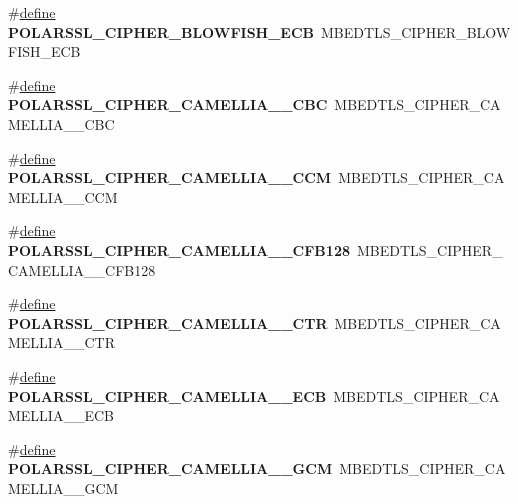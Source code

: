 \begin{DoxyCompactItemize}
\#\hyperlink{structdefine}{define} {\bfseries P\+O\+L\+A\+R\+S\+S\+L\+\_\+\+C\+I\+P\+H\+E\+R\+\_\+\+B\+L\+O\+W\+F\+I\+S\+H\+\_\+\+E\+CB}~M\+B\+E\+D\+T\+L\+S\+\_\+\+C\+I\+P\+H\+E\+R\+\_\+\+B\+L\+O\+W\+F\+I\+S\+H\+\_\+\+E\+CB
\item 
\mbox{\label{compat-1_83_8h_a45e63fa5969c68cc71e679618794284f}} 
\#\hyperlink{structdefine}{define} {\bfseries P\+O\+L\+A\+R\+S\+S\+L\+\_\+\+C\+I\+P\+H\+E\+R\+\_\+\+C\+A\+M\+E\+L\+L\+I\+A\+\_\+\_\+\+C\+BC}~M\+B\+E\+D\+T\+L\+S\+\_\+\+C\+I\+P\+H\+E\+R\+\_\+\+C\+A\+M\+E\+L\+L\+I\+A\+\_\+\_\+\+C\+BC
\item 
\mbox{\label{compat-1_83_8h_afb07268dd1ad947f7156d13b426b9fa7}} 
\#\hyperlink{structdefine}{define} {\bfseries P\+O\+L\+A\+R\+S\+S\+L\+\_\+\+C\+I\+P\+H\+E\+R\+\_\+\+C\+A\+M\+E\+L\+L\+I\+A\+\_\+\_\+\+C\+CM}~M\+B\+E\+D\+T\+L\+S\+\_\+\+C\+I\+P\+H\+E\+R\+\_\+\+C\+A\+M\+E\+L\+L\+I\+A\+\_\+\_\+\+C\+CM
\item 
\mbox{\label{compat-1_83_8h_a3292c3c9360e493d81ebe212aaafe8e8}} 
\#\hyperlink{structdefine}{define} {\bfseries P\+O\+L\+A\+R\+S\+S\+L\+\_\+\+C\+I\+P\+H\+E\+R\+\_\+\+C\+A\+M\+E\+L\+L\+I\+A\+\_\+\_\+\+C\+F\+B128}~M\+B\+E\+D\+T\+L\+S\+\_\+\+C\+I\+P\+H\+E\+R\+\_\+\+C\+A\+M\+E\+L\+L\+I\+A\+\_\+\_\+\+C\+F\+B128
\item 
\mbox{\label{compat-1_83_8h_a4e770a54964e63bfafe2ae68417566ba}} 
\#\hyperlink{structdefine}{define} {\bfseries P\+O\+L\+A\+R\+S\+S\+L\+\_\+\+C\+I\+P\+H\+E\+R\+\_\+\+C\+A\+M\+E\+L\+L\+I\+A\+\_\+\_\+\+C\+TR}~M\+B\+E\+D\+T\+L\+S\+\_\+\+C\+I\+P\+H\+E\+R\+\_\+\+C\+A\+M\+E\+L\+L\+I\+A\+\_\+\_\+\+C\+TR
\item 
\mbox{\label{compat-1_83_8h_ab4fdda668fca7795c6952e04816fa2e0}} 
\#\hyperlink{structdefine}{define} {\bfseries P\+O\+L\+A\+R\+S\+S\+L\+\_\+\+C\+I\+P\+H\+E\+R\+\_\+\+C\+A\+M\+E\+L\+L\+I\+A\+\_\+\_\+\+E\+CB}~M\+B\+E\+D\+T\+L\+S\+\_\+\+C\+I\+P\+H\+E\+R\+\_\+\+C\+A\+M\+E\+L\+L\+I\+A\+\_\+\_\+\+E\+CB
\item 
\mbox{\label{compat-1_83_8h_a9fd58e2c68e4d9e7dac9a72bec566d1f}} 
\#\hyperlink{structdefine}{define} {\bfseries P\+O\+L\+A\+R\+S\+S\+L\+\_\+\+C\+I\+P\+H\+E\+R\+\_\+\+C\+A\+M\+E\+L\+L\+I\+A\+\_\+\_\+\+G\+CM}~M\+B\+E\+D\+T\+L\+S\+\_\+\+C\+I\+P\+H\+E\+R\+\_\+\+C\+A\+M\+E\+L\+L\+I\+A\+\_\+\_\+\+G\+CM

\end{DoxyCompactItemize}
